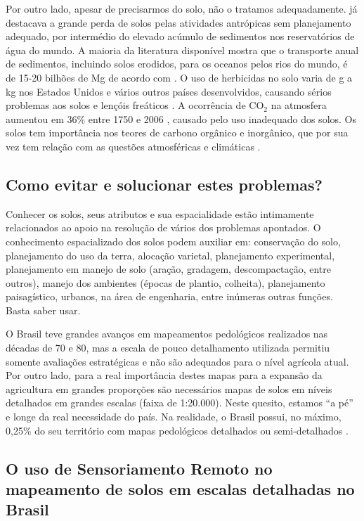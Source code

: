 Por outro lado, apesar de precisarmos do solo, não o tratamos adequadamente. \citet{Mahmood:1987} já destacava a grande perda de solos pelas atividades antrópicas sem planejamento adequado, por intermédio do elevado acúmulo de sedimentos nos reservatórios de água do mundo. A maioria da literatura disponível mostra que o transporte anual de sedimentos, incluindo solos erodidos, para os oceanos pelos rios do mundo, é de 15-20 bilhões de Mg de acordo com \citet{Lal:2003}. O uso de herbicidas no solo varia de g a kg nos Estados Unidos e vários outros países desenvolvidos, causando sérios problemas aos solos e lençóis freáticos \citep{SinghEtAl:2010}. A ocorrência de CO$_2$ na atmosfera aumentou em 36\% entre 1750 e 2006 \citep{CoelhoEtAl:2013}, causado pelo uso inadequado dos solos. Os solos tem importância nos teores de carbono orgânico e inorgânico, que por sua vez tem relação com as questões atmosféricas e climáticas \citep{Lal:1999}.

\subsection*{Como evitar e solucionar estes problemas?}

Conhecer os solos, seus atributos e sua espacialidade estão intimamente relacionados ao apoio na resolução de vários dos problemas apontados. O conhecimento espacializado dos solos podem auxiliar em: conservação do solo, planejamento do uso da terra, alocação varietal, planejamento experimental, planejamento em manejo de solo (aração, gradagem, descompactação, entre outros), manejo dos ambientes (épocas de plantio, colheita), planejamento paisagístico, urbanos, na área de engenharia, entre inúmeras outras funções. Basta saber usar.

O Brasil teve grandes avanços em mapeamentos pedológicos realizados nas décadas de 70 e 80, mas a escala de pouco detalhamento utilizada permitiu somente avaliações estratégicas e não são adequados para o nível agrícola atual. Por outro lado, para a real importância destes mapas para a expansão da agricultura em grandes proporções são necessários mapas de solos em níveis detalhados em grandes escalas (faixa de 1:20.000). Neste quesito, estamos ``a pé'' e longe da real necessidade do país. Na realidade, o Brasil possui, no máximo, 0,25\% do seu território com mapas pedológicos detalhados ou semi-detalhados \citep{Mendonca-SantosEtAl:2007}.

\subsection*{O uso de Sensoriamento Remoto no mapeamento de solos em escalas detalhadas no Brasil}

